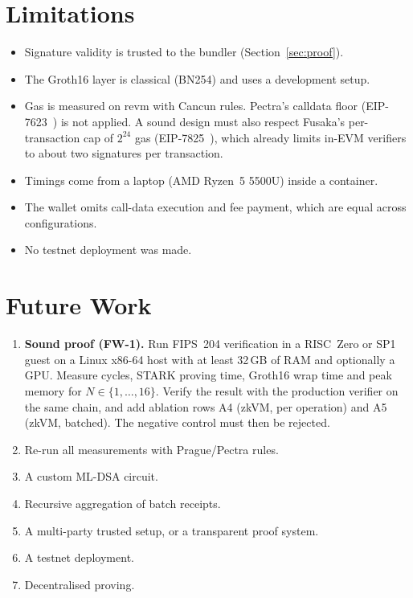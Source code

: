 \documentclass[conference]{IEEEtran}
\begin{document}
\begin{table}[t]
\centering
\caption{Security and correctness evaluation (details: \texttt{results/security.md}).}\label{tab:sec}
\scriptsize
\resizebox{\columnwidth}{!}{}
\end{table}

\section{Limitations}
\begin{itemize}
\item Signature validity is trusted to the bundler (Section~\ref{sec:proof}).
\item The Groth16 layer is classical (BN254) and uses a development setup.
\item Gas is measured on revm with Cancun rules. Pectra's calldata floor (EIP-7623~\cite{eip7623}) is not applied. A sound design must also respect Fusaka's per-transaction cap of $2^{24}$ gas (EIP-7825~\cite{eip7825}), which already limits in-EVM verifiers to about two signatures per transaction.
\item Timings come from a laptop (AMD Ryzen~5 5500U) inside a container.
\item The wallet omits call-data execution and fee payment, which are equal across configurations.
\item No testnet deployment was made.
\end{itemize}

\section{Future Work}\label{sec:future}
\begin{enumerate}
\item \textbf{Sound proof (FW-1).} Run FIPS~204 verification in a RISC~Zero or SP1 guest on a Linux x86-64 host with at least 32\,GB of RAM and optionally a GPU. Measure cycles, STARK proving time, Groth16 wrap time and peak memory for $N\in\{1,\dots,16\}$. Verify the result with the production verifier on the same chain, and add ablation rows A4 (zkVM, per operation) and A5 (zkVM, batched). The negative control must then be rejected.
\item Re-run all measurements with Prague/Pectra rules.
\item A custom ML-DSA circuit.
\item Recursive aggregation of batch receipts.
\item A multi-party trusted setup, or a transparent proof system.
\item A testnet deployment.
\item Decentralised proving.
\end{enumerate}
\end{document}
